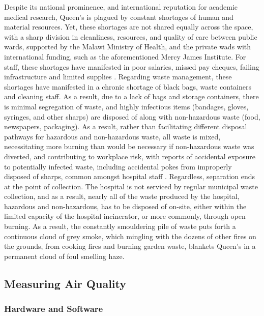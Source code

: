 \documentclass[
  authoryear,
  review,
  3p]{elsarticle}
\begin{document}
Despite its national prominence, and international reputation for
academic medical research, Queen's is plagued by constant shortages of
human and material resources. Yet, these shortages are not shared
equally across the space, with a sharp division in cleanliness,
resources, and quality of care between public wards, supported by the
Malawi Ministry of Health, and the private wads with international
funding, such as the aforementioned Mercy James Institute. For staff,
these shortages have manifested in poor salaries, missed pay cheques,
failing infrastructure and limited supplies \citep{tilley2020wea}.
Regarding waste management, these shortages have manifested in a chronic
shortage of black bags, waste containers and cleaning staff. As a
result, due to a lack of bags and storage containers, there is minimal
segregation of waste, and highly infectious items (bandages, gloves,
syringes, and other sharps) are disposed of along with non-hazardous
waste (food, newspapers, packaging). As a result, rather than
facilitating different disposal pathways for hazardous and non-hazardous
waste, all waste is mixed, necessitating more burning than would be
necessary if non-hazardous waste was diverted, and contributing to
workplace risk, with reports of accidental exposure to potentially
infected waste, including accidental pokes from improperly disposed of
sharps, common amongst hospital staff \citep{kalina2020this}.
Regardless, separation ends at the point of collection. The hospital is
not serviced by regular municipal waste collection, and as a result,
nearly all of the waste produced by the hospital, hazardous and
non-hazardous, has to be disposed of on-site, either within the limited
capacity of the hospital incinerator, or more commonly, through open
burning. As a result, the constantly smouldering pile of waste puts
forth a continuous cloud of grey smoke, which mingling with the dozens
of other fires on the grounds, from cooking fires and burning garden
waste, blankets Queen's in a permanent cloud of foul smelling haze.

\hypertarget{measuring-air-quality}{%
\subsection{Measuring Air Quality}\label{measuring-air-quality}}

\hypertarget{hardware-and-software}{%
\subsubsection{Hardware and Software}\label{hardware-and-software}}
\end{document}
